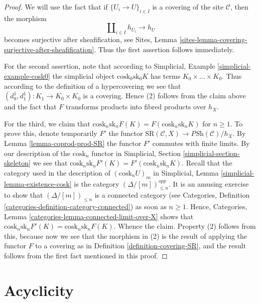 \begin{proof}
We will use the fact that if
$\{U_i \to U\}_{i \in I}$ is a covering of the site
$\mathcal{C}$, then the morphism
$$
\amalg_{i \in I} h_{U_i} \to h_U
$$
becomes surjective after sheafification, see
Sites, Lemma \ref{sites-lemma-covering-surjective-after-sheafification}.
Thus the first assertion follows immediately.

\medskip\noindent
For the second assertion, note that according to
Simplicial, Example \ref{simplicial-example-cosk0}
the simplicial object $\text{cosk}_0 \text{sk}_0 K$
has terms $K_0 \times \ldots \times K_0$. Thus
according to the definition of a hypercovering we
see that $(d^1_0, d^1_1) : K_1 \to K_0 \times K_0$ is a
covering. Hence (2) follows from the claim above
and the fact that $F$ transforms products into fibred
products over $h_X$.

\medskip\noindent
For the third, we claim that
$\text{cosk}_n \text{sk}_n F(K) =
F(\text{cosk}_n \text{sk}_n K)$ for $n \geq 1$.
To prove this, denote temporarily $F'$ the functor
$\text{SR}(\mathcal{C}, X) \to \textit{PSh}(\mathcal{C})/h_X$.
By Lemma \ref{lemma-coprod-prod-SR} the functor
$F'$ commutes with finite limits.
By our description of the $\text{cosk}_n$ functor in
Simplicial, Section \ref{simplicial-section-skeleton}
we see that $\text{cosk}_n \text{sk}_n F'(K) =
F'(\text{cosk}_n \text{sk}_n K)$.
Recall that the category used in the description of
$(\text{cosk}_n U)_m$ in
Simplicial, Lemma \ref{simplicial-lemma-existence-cosk}
is the category $(\Delta/[m])^{opp}_{\leq n}$. It is an
amusing exercise to show that $(\Delta/[m])_{\leq n}$ is
a connected category (see
Categories, Definition \ref{categories-definition-category-connected})
as soon as $n \geq 1$. Hence,
Categories, Lemma \ref{categories-lemma-connected-limit-over-X}
shows that $\text{cosk}_n \text{sk}_n F'(K) =
\text{cosk}_n \text{sk}_n F(K)$. Whence the claim.
Property (2) follows from this, because now we see that
the morphism in (2) is the result of applying the
functor $F$ to a covering as in Definition \ref{definition-covering-SR},
and the result follows from the first fact mentioned
in this proof.
\end{proof}



\section{Acyclicity}
\label{section-acyclicity}

